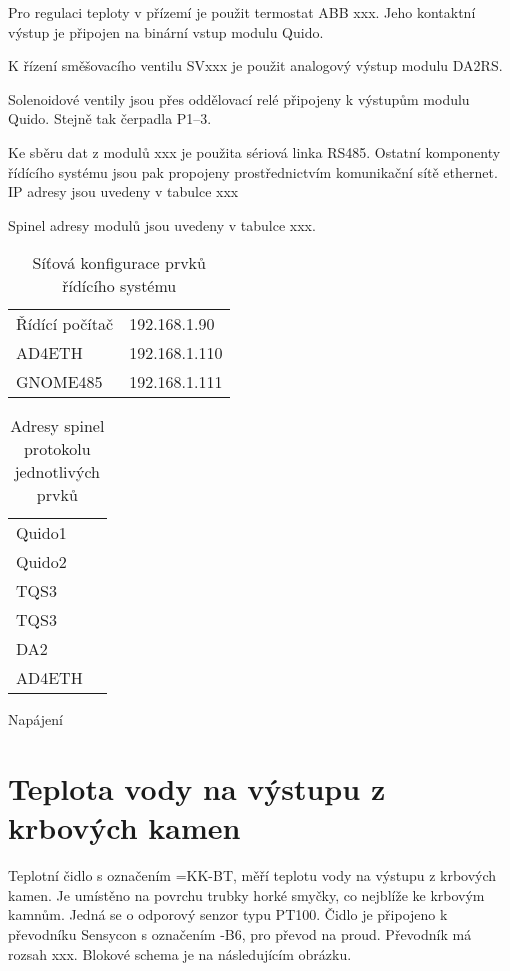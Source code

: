 \documentclass[a4paper,draft]{book}
\begin{document}
    Pro regulaci teploty v přízemí je použit termostat ABB xxx. Jeho kontaktní
    výstup je připojen na binární vstup modulu Quido.

    K řízení směšovacího ventilu SVxxx je použit analogový výstup modulu DA2RS.

    Solenoidové ventily jsou přes oddělovací relé připojeny k výstupům modulu
    Quido. Stejně tak čerpadla P1--3.

    Ke sběru dat z modulů xxx je použita sériová linka RS485. Ostatní komponenty
    řídícího systému jsou pak propojeny prostřednictvím komunikační sítě
    ethernet. IP adresy jsou uvedeny v tabulce xxx

    Spinel adresy modulů jsou uvedeny v tabulce xxx.

    \begin{table}
      \centering
      \begin{tabular}{ll}
        Řídící počítač & 192.168.1.90 \\
        AD4ETH         & 192.168.1.110\\
        GNOME485       & 192.168.1.111\\
      \end{tabular}
      \caption{Síťová konfigurace prvků řídícího systému}
    \end{table}

    \begin{table}
      \centering
      \begin{tabular}{ll}
        Quido1 & \\
        Quido2 & \\
        TQS3   & \\
        TQS3   & \\
        DA2    & \\
        AD4ETH &
      \end{tabular}
      \caption{Adresy spinel protokolu jednotlivých prvků}
    \end{table}

    Napájení

    \section{Teplota vody na výstupu z krbových kamen}

        Teplotní čidlo s označením =KK-BT, měří teplotu vody na
        výstupu z krbových kamen. Je umístěno na povrchu
        trubky horké smyčky, co nejblíže ke krbovým kamnům. Jedná se o odporový
        senzor typu PT100. Čidlo je připojeno k převodníku
        Sensycon s označením -B6, pro převod na
        proud. Převodník má rozsah xxx. Blokové schema je na následujícím
        obrázku.
\end{document}
